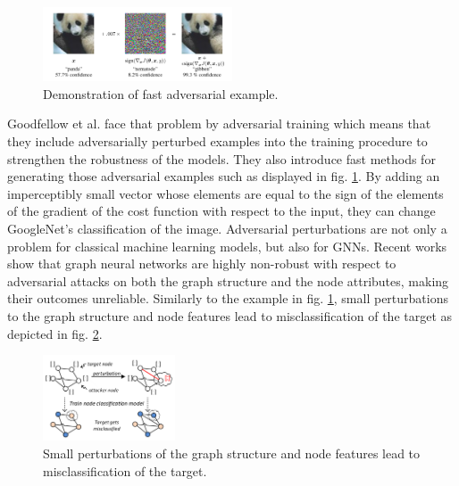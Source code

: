 \documentclass[a4paper,preprint]{sig-alternate}
\begin{document}
\begin{figure}[h]
    \centering
    \includegraphics[width=0.5\textwidth]{img/adversarial_example.png}
    \caption{Demonstration of fast adversarial example. \cite{goodfellow2015explaining}}
    \label{fig:adversarial_example}
\end{figure}

Goodfellow et al. \cite{goodfellow2015explaining} face that problem by adversarial training which means that they include adversarially 
perturbed examples into the training procedure to strengthen the robustness of the models. They also introduce fast methods for generating 
those adversarial examples such as displayed in fig. \ref{fig:adversarial_example}. By adding an imperceptibly small vector whose elements
are equal to the sign of the elements of the gradient of the cost function with respect to the input, they can change GoogleNet's classification
of the image.\cite{goodfellow2015explaining}\newline
Adversarial perturbations are not only a problem for classical machine learning models, but also for GNNs.
Recent works show that graph neural networks are highly non-robust with respect to adversarial attacks on both the graph
structure and the node attributes, making their outcomes unreliable.\cite{Z_gner_2019}
Similarly to the example in fig. \ref{fig:adversarial_example}, small perturbations to the graph structure and node features lead to 
misclassification of the target as depicted in fig. \ref{fig:adversarial_GNN}.

\begin{figure}[h]
    \centering
    \includegraphics[width=0.35\textwidth]{img/adversarial_GNN.png}
    \caption{Small perturbations of the graph structure and node features lead to misclassification of the target. \cite{Z_gner_2018}}
    \label{fig:adversarial_GNN}
\end{figure}
\end{document}
